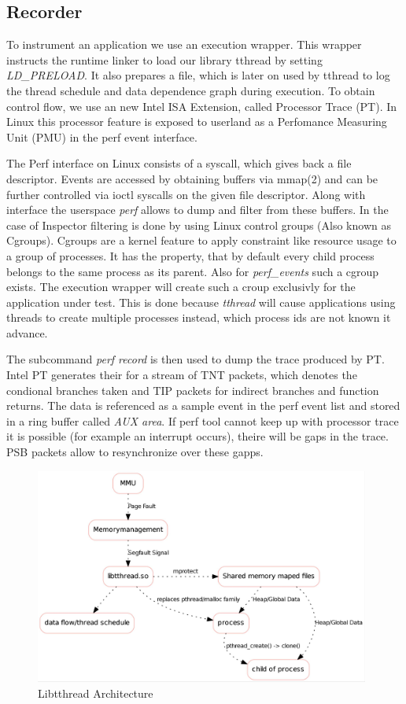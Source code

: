 \subsection{Recorder}


To instrument an application we use an execution wrapper. This wrapper instructs
the runtime linker to load our library tthread by setting \emph{LD\_PRELOAD}. It
also prepares a file, which is later on used by tthread to log the thread
schedule and data dependence graph during execution. To obtain control flow,
we use an new Intel ISA Extension, called Processor Trace (PT).
In Linux this processor feature is exposed to userland as a Perfomance Measuring
Unit (PMU) in the perf event interface.

The Perf interface on Linux consists of a syscall, which gives back a file
descriptor. Events are accessed by obtaining buffers via mmap(2) and can be
further controlled via ioctl syscalls on the given file descriptor. Along with
interface the userspace \emph{perf} allows to dump and filter from these
buffers. In the case of Inspector filtering is done by using Linux control
groups (Also known as Cgroups). Cgroups are a kernel feature to apply constraint
like resource usage to a group of processes. It has the property, that by
default every child process belongs to the same process as its parent. Also for
\emph{perf\_events} such a cgroup exists. The execution wrapper will create such
a croup exclusivly for the application under test. This is done because
\emph{tthread} will cause applications using threads to create multiple
processes instead, which process ids are not known it advance.

The subcommand \emph{perf record} is then used to dump the trace produced by PT.
Intel PT generates their for a stream of TNT packets, which denotes the
condional branches taken and TIP packets for indirect branches and function
returns. The data is referenced as a sample event in the perf event list and
stored in a ring buffer called \emph{AUX area}. If perf tool cannot
keep up with processor trace it is possible (for example an interrupt occurs),
theire will be gaps in the trace. PSB packets allow to resynchronize over these
gapps.

\begin{figure}[h]
\includegraphics[width=11cm]{figure/arch.jpg}
\caption{Libtthread Architecture}
\label{fig:tthread}
\end{figure}

